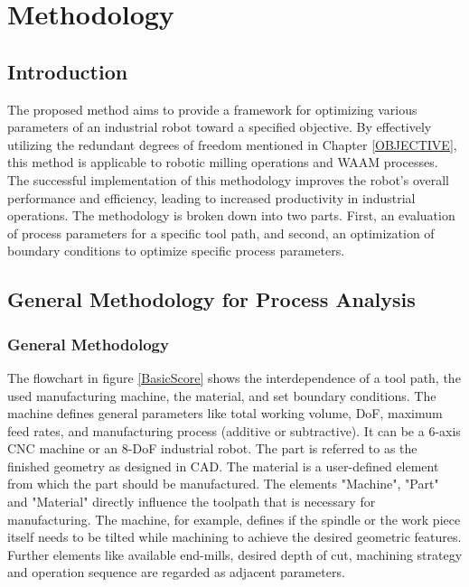 \chapter{Methodology}%

\section{Introduction}%

The proposed method aims to provide a framework for optimizing various parameters of an industrial robot toward a specified objective. By effectively utilizing the redundant degrees of freedom mentioned in Chapter \ref{OBJECTIVE}, this method is applicable to robotic milling operations and WAAM processes. The successful implementation of this methodology improves the robot's overall performance and efficiency, leading to increased productivity in industrial operations. The methodology is broken down into two parts. First, an evaluation of process parameters for a specific tool path, and second, an optimization of boundary conditions to optimize specific process parameters.

\section{General Methodology for Process Analysis}
\subsection{General Methodology}\label{general}

The flowchart in figure \ref{BasicScore} shows the interdependence of a tool path, the used manufacturing machine, the material, and set boundary conditions. The machine defines general parameters like total working volume, DoF, maximum feed rates, and manufacturing process (additive or subtractive). It can be a 6-axis CNC machine or an 8-DoF industrial robot. The part is referred to as the finished geometry as designed in CAD. The material is a user-defined element from which the part should be manufactured. The elements "Machine", "Part" and "Material" directly influence the toolpath that is necessary for manufacturing. The machine, for example, defines if the spindle or the work piece itself needs to be tilted while machining to achieve the desired geometric features. Further elements like available end-mills, desired depth of cut, machining strategy and operation sequence are regarded as adjacent parameters. 


